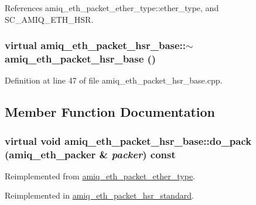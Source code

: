 References amiq\_\-eth\_\-packet\_\-ether\_\-type::ether\_\-type, and SC\_\-AMIQ\_\-ETH\_\-HSR.\hypertarget{classamiq__eth__packet__hsr__base_a6615f6811f3ea2c0a42cc19b44233cee}{
\subsubsection[{$\sim$amiq\_\-eth\_\-packet\_\-hsr\_\-base}]{\setlength{\rightskip}{0pt plus 5cm}virtual amiq\_\-eth\_\-packet\_\-hsr\_\-base::$\sim$amiq\_\-eth\_\-packet\_\-hsr\_\-base ()}}
\label{classamiq__eth__packet__hsr__base_a6615f6811f3ea2c0a42cc19b44233cee}


Definition at line 47 of file amiq\_\-eth\_\-packet\_\-hsr\_\-base.cpp.

\subsection{Member Function Documentation}
\hypertarget{classamiq__eth__packet__hsr__base_a6dc22f94409c889f248908b1454af8b0}{
\subsubsection[{do\_\-pack}]{\setlength{\rightskip}{0pt plus 5cm}virtual void amiq\_\-eth\_\-packet\_\-hsr\_\-base::do\_\-pack ({\bf amiq\_\-eth\_\-packer} \& {\em packer}) const}}
\label{classamiq__eth__packet__hsr__base_a6dc22f94409c889f248908b1454af8b0}


Reimplemented from \hyperlink{classamiq__eth__packet__ether__type_a62fe5f26a466f0bd0045599b89aa6926}{amiq\_\-eth\_\-packet\_\-ether\_\-type}.

Reimplemented in \hyperlink{classamiq__eth__packet__hsr__standard_a1dce9b763e3222c2fe257b15df912514}{amiq\_\-eth\_\-packet\_\-hsr\_\-standard}.

